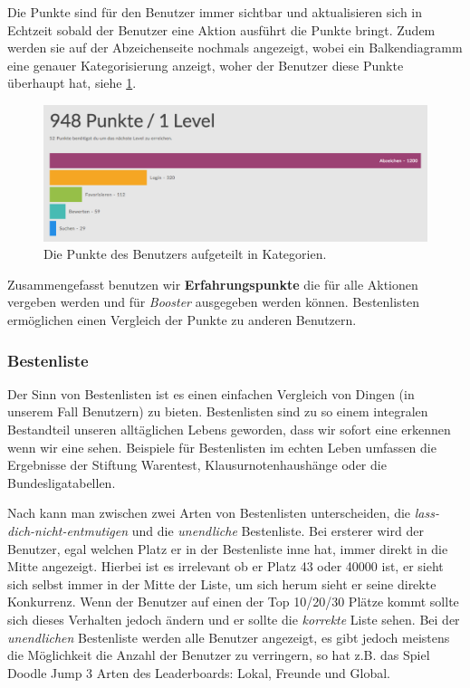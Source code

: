 \documentclass[12pt,twoside]{book}
\begin{document}
Die Punkte sind für den Benutzer immer sichtbar und aktualisieren sich in Echtzeit sobald der Benutzer eine Aktion ausführt die Punkte bringt. Zudem werden sie auf der Abzeichenseite nochmals angezeigt, wobei ein Balkendiagramm eine genauer Kategorisierung anzeigt, woher der Benutzer diese Punkte überhaupt hat, siehe \ref{fig:points}.

\begin{figure}[h]
    \centering
    \includegraphics[width=1.0\textwidth]{images/infoboard_userstats.png}
    \caption{Die Punkte des Benutzers aufgeteilt in Kategorien.}
    \label{fig:points}
\end{figure}

Zusammengefasst benutzen wir \textbf{Erfahrungspunkte} die für alle Aktionen vergeben werden und für \textit{Booster} ausgegeben werden können. Bestenlisten ermöglichen einen Vergleich der Punkte zu anderen Benutzern.

\subsubsection{Bestenliste}

Der Sinn von Bestenlisten ist es einen einfachen Vergleich von Dingen (in unserem Fall Benutzern) zu bieten. Bestenlisten sind zu so einem integralen Bestandteil unseren alltäglichen Lebens geworden, dass wir sofort eine erkennen wenn wir eine sehen. Beispiele für Bestenlisten im echten Leben umfassen die Ergebnisse der Stiftung Warentest, Klausurnotenhaushänge oder die Bundesligatabellen.

Nach \citep{zichermann2011gamification, 50 - 51} kann man zwischen zwei Arten von Bestenlisten unterscheiden, die \textit{lass-dich-nicht-entmutigen} und die \textit{unendliche} Bestenliste. Bei ersterer wird der Benutzer, egal welchen Platz er in der Bestenliste inne hat, immer direkt in die Mitte angezeigt. Hierbei ist es irrelevant ob er Platz 43 oder 40000 ist, er sieht sich selbst immer in der Mitte der Liste, um sich herum sieht er seine direkte Konkurrenz. Wenn der Benutzer auf einen der Top 10/20/30 Plätze kommt sollte sich dieses Verhalten jedoch ändern und er sollte die \textit{korrekte} Liste sehen.
Bei der \textit{unendlichen} Bestenliste werden alle Benutzer angezeigt, es gibt jedoch meistens die Möglichkeit die Anzahl der Benutzer zu verringern, so hat z.B. das Spiel Doodle Jump 3 Arten des Leaderboards: Lokal, Freunde und Global.
\end{document}
